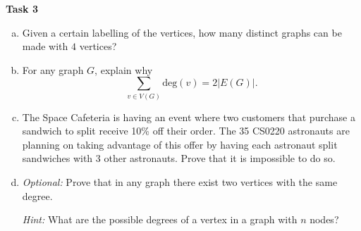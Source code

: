 \documentclass[12pt,letterpaper]{article}
\newif\ifsol
\newcommand{\solu}[2]{ \begin{mdframed} \ifsol #2 \else \vspace{#1} \fi \end{mdframed} }
\begin{document}
\textbf{Task 3}
\begin{enumerate}[a.]
    \item Given a certain labelling of the vertices, how many distinct graphs can be made with $4$ vertices?
    
    \solu{1cm}{For each pair of vertices, there exists a possible edge. Thus, there are $\binom{n}{2}$ possible edges. Each can be either in or not in the edge set of a graph, so there are $2^\binom{n}{2}$ possible graphs. When $n=4$, this quantity is equal to $2^{\binom{4}{2}} = 2^6 = 64$.}
    
    \item For any graph $G$, explain why $$\sum_{v \in V(G)}\text{deg}(v) = 2|E(G)|.$$
    \solu{2cm}{The degree of a vertex is a count of the number of vertices it is adjacent to; hence, the number of edges that contain the vertex. When we add up all the degrees, we are counting each edge twice since each edge is a set of two vertices.}
    
    \item The Space Cafeteria is having an event where two customers that purchase a sandwich to split receive 10\% off their order. The 35 CS0220 astronauts are planning on taking advantage of this offer by having each astronaut split sandwiches with 3 other astronauts. Prove that it is impossible to do so.
    \solu{2cm}{Let each astronaut be a vertex such that there exists an edge between two astronauts if and only if they are splitting a sandwich. Each of the 35 vertices has degree 3, so the sum of the degrees is 105. We just proved that this equals 2 times the number of edges, which means there are 52.5 edges. Since 52.5 isn't an integer, this division is impossible.}
    
    \item \textit{Optional:} Prove that in any graph there exist two vertices with the same degree.
    
    \textit{Hint:} What are the possible degrees of a vertex in a graph with $n$ nodes?
    \solu{2cm}{A vertex can have degree from 0 to $n-1$. However, if a vertex has degree $n-1$, there can't be a vertex with degree 0 because that vertex is adjacent to every other. So, in this case, there are $n-1$ possible values for the degree of a vertex, and $n$ vertices: by the pigeonhole principle, two must have the same degree. On the other hand, if there is no vertex of degree $n-1$, then vertices can have degree 0 through $n-2$: still $n-1$ options, so by the pigeonhole principle two have the same degree.}
\end{enumerate}
\end{document}
